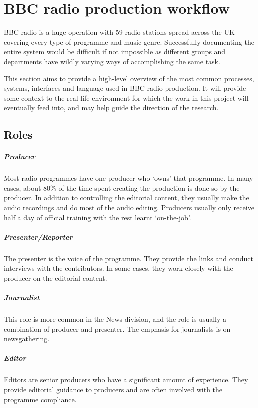 \chapter{BBC radio production workflow}\label{sec:production}
BBC radio is a huge operation with 59 radio stations spread across the UK
covering every type of programme and music genre. Successfully documenting the
entire system would be difficult if not impossible as different groups and
departments have wildly varying ways of accomplishing the same task.

This section aims to provide a high-level overview of the most common
processes, systems, interfaces and language used in BBC radio production. It
will provide some context to the real-life environment for which the work in
this project will eventually feed into, and may help guide the direction of the
research.

\section{Roles}\label{sec:roles}

\paragraph{Producer}
Most radio programmes have one producer who `owns' that programme.  In many
cases, about 80\% of the time spent creating the production is done so by the
producer. In addition to controlling the editorial content, they usually make
the audio recordings and do most of the audio editing. Producers usually only
receive half a day of official training with the rest learnt `on-the-job'.

\paragraph{Presenter/Reporter}
The presenter is the voice of the programme. They provide the links and conduct
interviews with the contributors. In some cases, they work closely with the
producer on the editorial content.

\paragraph{Journalist}
This role is more common in the News division, and the role is usually a
combination of producer and presenter. The emphasis for journalists is on
newsgathering.

\paragraph{Editor}
Editors are senior producers who have a significant amount of experience. They
provide editorial guidance to producers and are often involved with the
programme compliance.

